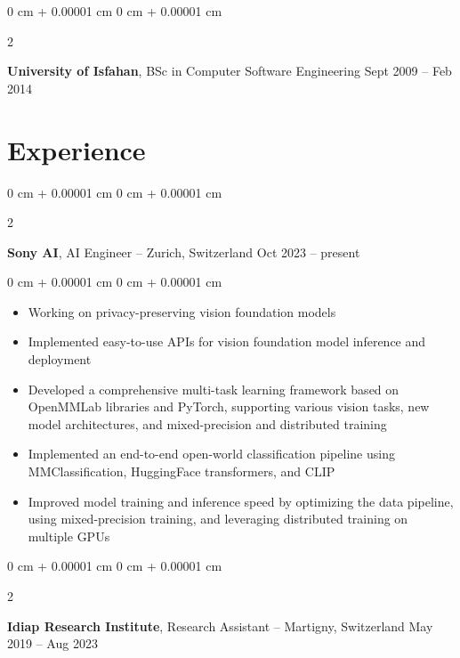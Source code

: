 \documentclass[10pt, a4paper]{article}
\newenvironment{highlights}{
    \begin{itemize}[
        topsep=0.10 cm,
        parsep=0.10 cm,
        partopsep=0pt,
        itemsep=0pt,
        leftmargin=5 pt + 10pt
    ]
}{
    \end{itemize}
} %
\newenvironment{onecolentry}{
    \begin{adjustwidth}{
        0 cm + 0.00001 cm
    }{
        0 cm + 0.00001 cm
    }
}{
    \end{adjustwidth}
} %
\newenvironment{twocolentry}[2][]{
    \onecolentry
    \def\secondColumn{#2}
    \setcolumnwidth{\fill, 4.5 cm}
    \begin{paracol}{2}
}{
    \switchcolumn \raggedleft \secondColumn
    \end{paracol}
    \endonecolentry
} %
\begin{document}
        \vspace{0.2 cm}

        \begin{twocolentry}{
            Sept 2009 – Feb 2014
        }
            \textbf{University of Isfahan}, BSc in Computer Software Engineering\end{twocolentry}




    
    \section{Experience}



        
        \begin{twocolentry}{
            Oct 2023 – present
        }
            \textbf{Sony AI}, AI Engineer -- Zurich, Switzerland\end{twocolentry}

        \vspace{0.10 cm}
        \begin{onecolentry}
            \begin{highlights}
                \item Working on privacy-preserving vision foundation models
                \item Implemented easy-to-use APIs for vision foundation model inference and deployment
                \item Developed a comprehensive multi-task learning framework based on OpenMMLab libraries and PyTorch, supporting various vision tasks, new model architectures, and mixed-precision and distributed training
                \item Implemented an end-to-end open-world classification pipeline using MMClassification, HuggingFace transformers, and CLIP
                \item Improved model training and inference speed by optimizing the data pipeline, using mixed-precision training, and leveraging distributed training on multiple GPUs
            \end{highlights}
        \end{onecolentry}


        \vspace{0.2 cm}

        \begin{twocolentry}{
            May 2019 – Aug 2023
        }
            \textbf{Idiap Research Institute}, Research Assistant -- Martigny, Switzerland\end{twocolentry}
\end{document}
